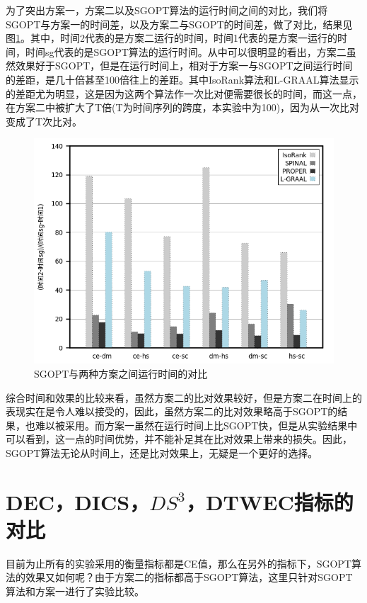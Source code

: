 为了突出方案一，方案二以及SGOPT算法的运行时间之间的对比，我们将SGOPT与方案一的时间差，以及方案二与SGOPT的时间差，做了对比，结果见图\ref{fig:allt-t2}。其中，时间2代表的是方案二运行的时间，时间1代表的是方案一运行的时间，时间sg代表的是SGOPT算法的运行时间。从中可以很明显的看出，方案二虽然效果好于SGOPT，但是在运行时间上，相对于方案一与SGOPT之间运行时间的差距，是几十倍甚至100倍往上的差距。其中IsoRank算法和L-GRAAL算法显示的差距尤为明显，这是因为这两个算法作一次比对便需要很长的时间，而这一点，在方案二中被扩大了T倍(T为时间序列的跨度，本实验中为100)，因为从一次比对变成了T次比对。
\begin{figure}[htbp]
\centering
\includegraphics[height=0.25\textheight]{pic/allt-t2.png}
\caption{SGOPT与两种方案之间运行时间的对比} 
\label{fig:allt-t2}
\end{figure}

综合时间和效果的比较来看，虽然方案二的比对效果较好，但是方案二在时间上的表现实在是令人难以接受的，因此，虽然方案二的比对效果略高于SGOPT的结果，也难以被采用。而方案一虽然在运行时间上比SGOPT快，但是从实验结果中可以看到，这一点的时间优势，并不能补足其在比对效果上带来的损失。因此，SGOPT算法无论从时间上，还是比对效果上，无疑是一个更好的选择。

\section{DEC，DICS，$DS^3$，DTWEC指标的对比}
目前为止所有的实验采用的衡量指标都是CE值，那么在另外的指标下，SGOPT算法的效果又如何呢？由于方案二的指标都高于SGOPT算法，这里只针对SGOPT算法和方案一进行了实验比较。


